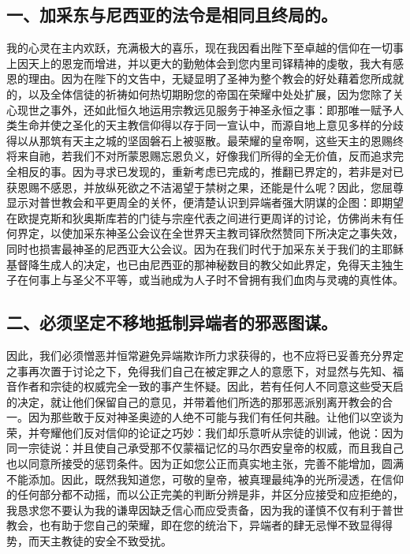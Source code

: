 
\subsection{一、加采东与尼西亚的法令是相同且终局的。}

我的心灵在主内欢跃，充满极大的喜乐，现在我因看出陛下至卓越的信仰在一切事上因天上的恩宠而增进，并以更大的勤勉体会到您内里司铎精神的虔敬，我大有感恩的理由。因为在陛下的文告中，无疑显明了圣神为整个教会的好处藉着您所成就的，以及全体信徒的祈祷如何热切期盼您的帝国在荣耀中处处扩展，因为您除了关心现世之事外，还如此恒久地运用宗教远见服务于神圣永恒之事：即那唯一赋予人类生命并使之圣化的天主教信仰得以存于同一宣认中，而源自地上意见多样的分歧得以从那筑有天主之城的坚固磐石上被驱散。最荣耀的皇帝啊，这些天主的恩赐终将来自祂，若我们不对所蒙恩赐忘恩负义，好像我们所得的全无价值，反而追求完全相反的事。因为寻求已发现的，重新考虑已完成的，推翻已界定的，若非是对已获恩赐不感恩，并放纵死欲之不洁渴望于禁树之果，还能是什么呢？因此，您屈尊显示对普世教会和平更周全的关怀，便清楚认识到异端者强大阴谋的企图：即期望在欧提克斯和狄奥斯库若的门徒与宗座代表之间进行更周详的讨论，仿佛尚未有任何界定，以使加采东神圣公会议在全世界天主教司铎欣然赞同下所决定之事失效，同时也损害最神圣的尼西亚大公会议。因为在我们时代于加采东关于我们的主耶稣基督降生成人的决定，也已由尼西亚的那神秘数目的教父如此界定，免得天主独生子在何事上与圣父不平等，或当祂成为人子时不曾拥有我们血肉与灵魂的真性体。\par


\subsection{二、必须坚定不移地抵制异端者的邪恶图谋。}

因此，我们必须憎恶并恒常避免异端欺诈所力求获得的，也不应将已妥善充分界定之事再次置于讨论之下，免得我们自己在被定罪之人的意愿下，对显然与先知、福音作者和宗徒的权威完全一致的事产生怀疑。因此，若有任何人不同意这些受天启的决定，就让他们保留自己的意见，并带着他们所选的那邪恶派别离开教会的合一。因为那些敢于反对神圣奥迹的人绝不可能与我们有任何共融。让他们以空谈为荣，并夸耀他们反对信仰的论证之巧妙：我们却乐意听从宗徒的训诫，他说：因为同一宗徒说：并且使自己承受那不仅蒙福记忆的马尔西安皇帝的权威，而且我自己也以同意所接受的惩罚条件。因为正如您公正而真实地主张，完善不能增加，圆满不能添加。因此，既然我知道您，可敬的皇帝，被真理最纯净的光所浸透，在信仰的任何部分都不动摇，而以公正完美的判断分辨是非，并区分应接受和应拒绝的，我恳求您不要认为我的谦卑因缺乏信心而应受责备，因为我的谨慎不仅有利于普世教会，也有助于您自己的荣耀，即在您的统治下，异端者的肆无忌惮不致显得得势，而天主教徒的安全不致受扰。\par

